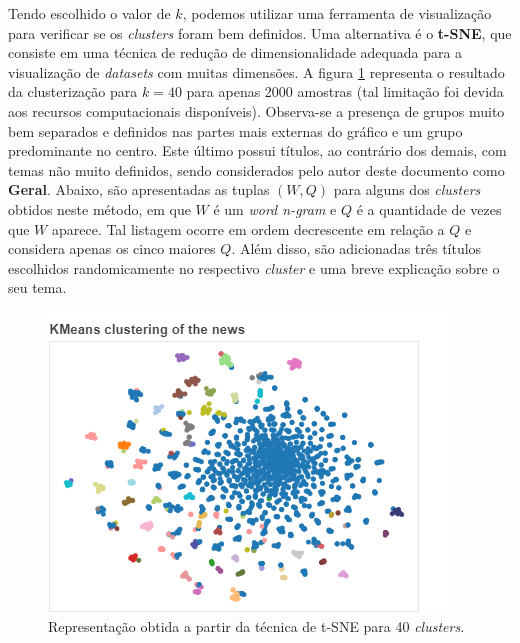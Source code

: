 \documentclass[10pt,twocolumn,letterpaper]{article}
\begin{document}
Tendo escolhido o valor de \(k\), podemos utilizar uma ferramenta de visualização para verificar se os \textit{clusters} foram bem definidos. Uma alternativa é o \textbf{t-SNE}, que consiste em uma técnica de redução de dimensionalidade adequada para a visualização de \textit{datasets} com muitas dimensões. A figura \ref{img:tsne_svd} representa o resultado da clusterização para \(k = 40\) para apenas 2000 amostras (tal limitação foi devida aos recursos computacionais disponíveis). Observa-se a presença de grupos muito bem separados e definidos nas partes mais externas do gráfico e um grupo predominante no centro. Este último possui títulos, ao contrário dos demais, com temas não muito definidos, sendo considerados pelo autor deste documento como \textbf{Geral}. Abaixo, são apresentadas as tuplas \((W, Q)\) para alguns dos \textit{clusters} obtidos neste método, em que \(W\) é um \textit{word n-gram}
e \(Q\) é a quantidade de vezes que \(W\) aparece. Tal listagem ocorre em ordem decrescente em relação a \(Q\) e considera apenas os cinco maiores \(Q\). Além disso, são adicionadas três títulos escolhidos randomicamente no respectivo \textit{cluster} e uma breve explicação sobre o seu tema.

\begin{figure}
    \centering
    \includegraphics[width=\columnwidth]{figs/bokeh_plot_tfidf_1-5_svd_no_legend}
    \caption{Representação obtida a partir da técnica de t-SNE para 40 \textit{clusters}.}
    \label{img:tsne_svd}
\end{figure}
\end{document}

